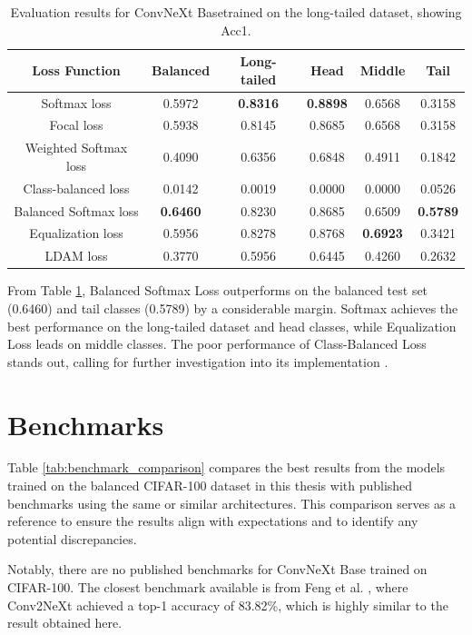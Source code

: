 \begin{table}[h!]
    \centering
    \caption{Evaluation results for ConvNeXt Basetrained on the long-tailed dataset, showing Acc1.}
    \begin{tabular}{cccccc}
        \toprule
        Loss Function & Balanced & Long-tailed & Head & Middle & Tail \\ 
        \midrule
        Softmax loss   & 0.5972 & \textbf{0.8316} & \textbf{0.8898} & 0.6568 & 0.3158 \\
        Focal loss   & 0.5938 & 0.8145 & 0.8685 & 0.6568 & 0.3158 \\
        Weighted Softmax loss   & 0.4090 & 0.6356 & 0.6848 & 0.4911 & 0.1842 \\
        Class-balanced loss   & 0.0142 & 0.0019 & 0.0000 & 0.0000 & 0.0526 \\
        Balanced Softmax loss   & \textbf{0.6460} & 0.8230 & 0.8685 & 0.6509 & \textbf{0.5789} \\
        Equalization loss   & 0.5956 & 0.8278 & 0.8768 & \textbf{0.6923} & 0.3421 \\
        LDAM loss   & 0.3770 & 0.5956 & 0.6445 & 0.4260 & 0.2632 \\
        \bottomrule
    \end{tabular}
    \label{tab:conv_lt_acc1_1}
\end{table}

From Table \ref{tab:conv_lt_acc1_1}, Balanced Softmax Loss outperforms on the balanced test set (0.6460) and tail classes (0.5789) by a considerable margin. Softmax achieves the best performance on the long-tailed dataset and head classes, while Equalization Loss leads on middle classes. The poor performance of Class-Balanced Loss stands out, calling for further investigation into its implementation . 

\section{Benchmarks}
Table \ref{tab:benchmark_comparison} compares the best results from the models trained on the balanced CIFAR-100 dataset in this thesis with published benchmarks using the same or similar architectures. This comparison serves as a reference to ensure the results align with expectations and to identify any potential discrepancies. 

Notably, there are no published benchmarks for ConvNeXt Base trained on CIFAR-100. The closest benchmark available is from Feng et al. \cite{10072172}, where Conv2NeXt achieved a top-1 accuracy of 83.82\%, which is highly similar to the result obtained here.

